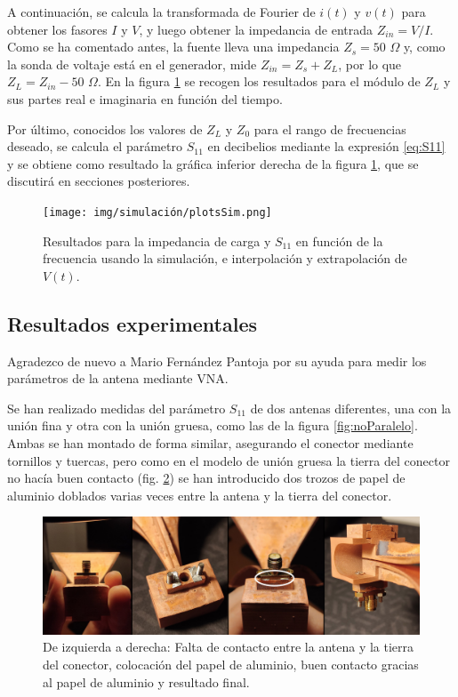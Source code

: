 \documentclass[11pt,a4paper,twoside,pdf]{article}
\numberwithin{equation}{section}
\begin{document}
A continuación, se calcula la transformada de Fourier de $i(t)$ y $v(t)$ para obtener los fasores $I$ y $V$, y luego obtener la impedancia de entrada $Z_{in}=V/I$. Como se ha comentado antes, la fuente lleva una impedancia $Z_s=50$ $\Omega$ y, como la sonda de voltaje está en el generador, mide $Z_{in}=Z_s+Z_L$, por lo que $Z_L=Z_{in}-50$ $\Omega$. En la figura \ref{fig:plotSim} se recogen los resultados para el módulo de $Z_L$ y sus partes real e imaginaria en función del tiempo.

Por último, conocidos los valores de $Z_L$ y $Z_0$ para el rango de frecuencias deseado, se calcula el parámetro $S_{11}$ en decibelios mediante la expresión \ref{eq:S11} y se obtiene como resultado la gráfica inferior derecha de la figura \ref{fig:plotSim}, que se discutirá en secciones posteriores.
\vspace{-0.5cm}
\begin{figure}[!h]
    \centering
    \texttt{[image: img/simulación/plotsSim.png]}
    \vspace{-0.4cm}
    \caption{Resultados para la impedancia de carga y $S_{11}$ en función de la frecuencia usando la simulación, e interpolación y extrapolación de $V(t)$.}
    \label{fig:plotSim}
\end{figure}


\subsection{Resultados experimentales}

Agradezco de nuevo a Mario Fernández Pantoja por su ayuda para medir los parámetros de la antena mediante VNA.

Se han realizado medidas del parámetro $S_{11}$ de dos antenas diferentes, una con la unión fina y otra con la unión gruesa, como las de la figura \ref{fig:noParalelo}. Ambas se han montado de forma similar, asegurando el conector mediante tornillos y tuercas, pero como en el modelo de unión gruesa la tierra del conector no hacía buen contacto (fig. \ref{fig:contactoAluminio}) se han introducido dos trozos de papel de aluminio doblados varias veces entre la antena y la tierra del conector.
\begin{figure}[!h]
    \centering
    \includegraphics[width=\linewidth]{img/medidasExp/contactoAluminio.jpg}
    \vspace{-0.5cm}
    \caption{De izquierda a derecha: Falta de contacto entre la antena y la tierra del conector, colocación del papel de aluminio, buen contacto gracias al papel de aluminio y resultado final.}
    \label{fig:contactoAluminio}
\end{figure}
\end{document}
